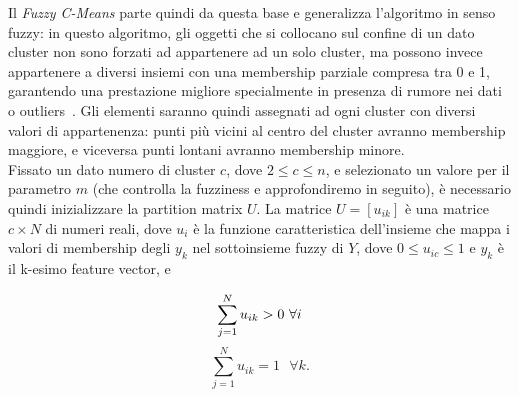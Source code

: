 \documentclass[oneside, openany]{book}
\begin{document}
		Il \textit{Fuzzy C-Means} parte quindi da questa base e generalizza l'algoritmo in senso fuzzy: in questo algoritmo, gli oggetti che si collocano sul confine di un dato cluster non sono forzati ad appartenere ad un solo cluster, ma possono invece appartenere a diversi insiemi con una membership parziale compresa tra 0 e 1, garantendo una prestazione migliore specialmente in presenza di rumore nei dati o outliers~\cite{bib:kmvsfcm}. 
		Gli elementi saranno quindi assegnati ad ogni cluster con diversi valori di appartenenza: punti più vicini al centro del cluster avranno membership maggiore, e viceversa punti lontani avranno membership minore.\\
		Fissato un dato numero di cluster $c$, dove $2\leq c \le n$,  e selezionato un valore per il parametro $m$ (che controlla la fuzziness e approfondiremo in seguito), è necessario quindi inizializzare la partition matrix $U$. La matrice $U=[u_{ik}]$ è una matrice $c\times N$ di numeri reali, dove $u_i$  è la funzione caratteristica dell'insieme che mappa i valori di membership degli $y_k$ nel sottoinsieme fuzzy di $Y$, dove $0\leq u_{ic}\leq 1$
		e $y_k$ è il k-esimo feature vector, e
	
		\[
		\sum_{j=1}^{N}u_{ik} > 0\text{ } \forall i\\
		\]
		\[
		\sum_{j=1}^{N}u_{ik} = 1 \text{ }\forall k\text{.}
		\]
		
\end{document}
